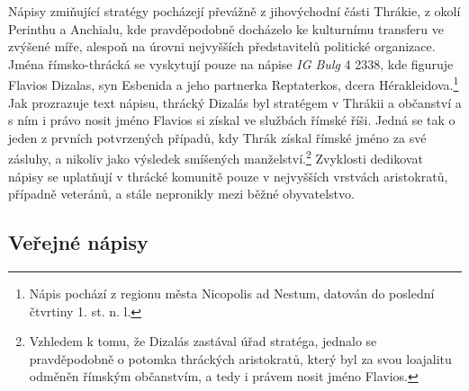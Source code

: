 Nápisy zmiňující stratégy pocházejí převážně z jihovýchodní části Thrákie, z okolí Perinthu a Anchialu, kde pravděpodobně docházelo ke kulturnímu transferu ve zvýšené míře, alespoň na úrovni nejvyšších představitelů politické organizace. Jména římsko-thrácká se vyskytují pouze na nápise {\em IG Bulg} 4 2338, kde figuruje Flavios Dizalas, syn Esbenida a jeho partnerka Reptaterkos, dcera Hérakleidova.\footnote{Nápis pochází z regionu města Nicopolis ad Nestum, datován do poslední čtvrtiny 1. st. n. l.} Jak prozrazuje text nápisu, thrácký Dizalás byl stratégem v Thrákii a občanství a s ním i právo nosit jméno Flavios si získal ve službách římské říši. Jedná se tak o jeden z prvních potvrzených případů, kdy Thrák získal římské jméno za své zásluhy, a nikoliv jako výsledek smíšených manželství.\footnote{Vzhledem k tomu, že Dizalás zastával úřad stratéga, jednalo se pravděpodobně o potomka thráckých aristokratů, který byl za svou loajalitu odměněn římským občanstvím, a tedy i právem nosit jméno Flavios.} Zvyklosti dedikovat nápisy se uplatňují v thrácké komunitě pouze v nejvyšších vrstvách aristokratů, případně veteránů, a stále nepronikly mezi běžné obyvatelstvo.

\subsection[veřejné-nápisy-11]{Veřejné nápisy}

